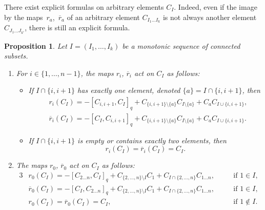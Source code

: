 \documentclass[10pt,a4paper]{amsart}
\numberwithin{equation}{section}
\newtheorem{prop}[theo]{Proposition}
\theoremstyle{definition}
\newcommand{\rb}{\overline{r}}
\begin{document}
There exist explicit formulas on arbitrary elements $C_I$. Indeed, even if the image by the maps~$r_a$,~$\rb_a$ of an arbitrary element $C_{I_1\dots I_k}$ is not always another element $C_{J_1\dots J_{k'}}$, there is still an explicit formula.
\begin{prop}\label{prop-ri}
Let $I=(I_1,\dots,I_k)$ be a monotonic sequence of connected subsets.

\begin{enumerate}\itemsep=0pt
\item[$1.$] For $i\in\{1,\dots,n-1\}$, the maps $r_i$, $\rb_i$ act on $C_{I}$ as follows:
\begin{itemize}\itemsep=0pt
 \item If $I\cap\{i,i+1\}$ has exactly one element, denoted $\{a\}=I\cap\{i,i+1\}$, then
\begin{align}\label{def-ri}
&r_i(C_I)=-[C_{i,i+1},C_{I}]_q+C_{ \{i,i+1\}\setminus\{a\} }C_{I\setminus \{a\}}+C_{a}C_{I\cup\{i,i+1\}} ,
\\
\label{def-rbi}
&\rb_i(C_I)= -[C_{I},C_{i,i+1}]_q+C_{ \{i,i+1\}\setminus\{a\} }C_{I\setminus \{a\}}+C_{a}C_{I\cup\{i,i+1\}} .
\end{align}
\item
If $I\cap\{i,i+1\}$ is empty or contains exactly two elements, then \begin{equation} r_i(C_I)=\rb_i(C_I)=C_I. \label{def-rrbi}\end{equation}
\end{itemize}
\item[$2.$] The maps $r_0$, $\rb_0$ act on $C_{I}$ as follows:
\begin{alignat}{3}
& r_0(C_I)=-[C_{2\dots n},C_{I}]_q+C_{ \{2,\dots,n\}\setminus I }C_{1}+C_{I\cap\{2,\dots,n\}}C_{1\dots n} , \quad && \text{if $1\in I$,} & \nonumber\\
& \rb_0(C_I)= -[C_{I},C_{2\dots n}]_q+C_{ \{2,\dots,n\}\setminus I }C_{1}+C_{I\cap\{2,\dots,n\}}C_{1\dots n} , && \text{if $1\in I$,} & \nonumber\\
& r_0(C_I)=\rb_0(C_I)=C_I , && \text{if $1\notin I$.} &\label{def-r0}
\end{alignat}
\end{enumerate}
\end{prop}
\end{document}
